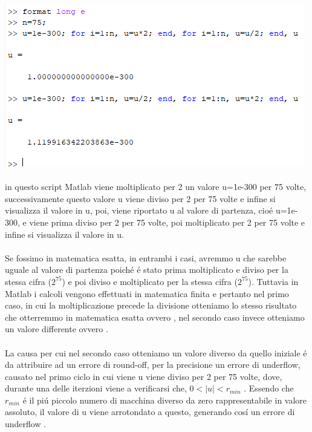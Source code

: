 \includegraphics[width=1\linewidth]{img/ex3}
\\~\\
\noindent  in questo script Matlab viene moltiplicato per 2 un valore u=1e-300 per 75 volte, successivamente questo valore u viene diviso per 2 per 75 volte e infine si visualizza il valore in u, poi, viene riportato u al valore di partenza, cio\'e u=1e-300, e viene prima diviso per 2 per 75 volte, poi moltiplicato per 2 per 75 volte  e infine si visualizza il valore in u.
\\~\\
\noindent Se fossimo in matematica esatta, in entrambi i casi, avremmo u che sarebbe uguale al valore di partenza poich\'e \'e stato prima moltiplicato e diviso per la stessa cifra ($2^{75}$) e poi diviso e moltiplicato per la stessa cifra ($2^{75}$). Tuttavia in Matlab i calcoli vengono effettuati in matematica finita e pertanto nel primo caso, in cui la moltiplicazione precede la divisione otteniamo lo stesso risultato che otterremmo in matematica esatta ovvero , nel secondo caso invece otteniamo un valore differente ovvero .
\\~\\
\noindent La causa per cui nel secondo caso otteniamo un valore diverso da quello iniziale \'e da attribuire ad un errore di round-off, per la precisione un errore di underflow, causato nel primo ciclo in cui viene u viene diviso per 2 per 75 volte, dove, durante una delle iterzioni viene a verificarsi che, $0 < \left | u \right |< r_{min}$ . Essendo che $ r_{min}$ \'e il pi\'u piccolo numero di macchina diverso da zero rappresentabile in valore assoluto, il valore di u viene arrotondato a questo, generando cos\'i un errore di underflow .
\newline
\newline